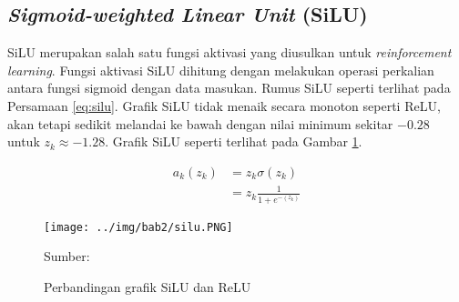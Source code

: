     \subsection{\textit{Sigmoid-weighted Linear Unit} (SiLU)}
    SiLU merupakan salah satu fungsi aktivasi yang diusulkan untuk \textit{reinforcement learning}. Fungsi aktivasi SiLU dihitung dengan melakukan operasi perkalian antara fungsi sigmoid dengan data masukan. Rumus SiLU seperti terlihat pada Persamaan \ref{eq:silu}. Grafik SiLU tidak menaik secara monoton seperti ReLU, akan tetapi sedikit melandai ke bawah dengan nilai minimum sekitar $-0.28$ untuk $z_k \approx -1.28$. Grafik SiLU seperti terlihat pada Gambar \ref{fig:silu}.

    \begin{align}
        \label{eq:silu}
        a_k(z_k) &= z_k\sigma (z_k)\nonumber\\
        &= z_k\frac{1}{1+e^{-(z_k)}}
    \end{align}

    \begin{figure}[H]
        \begin{center}
            \texttt{[image: ../img/bab2/silu.PNG]}
            \caption{Perbandingan grafik SiLU dan ReLU}
            \label{fig:silu}
            Sumber: \citep{Elfwing2018}
        \end{center}
    \end{figure}


